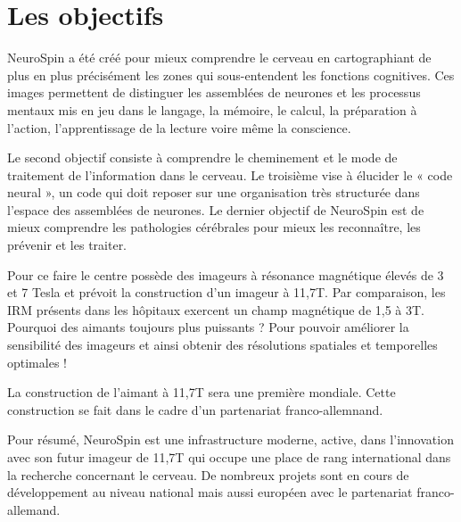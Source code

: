 \section{Les objectifs}

NeuroSpin a été créé pour mieux comprendre le cerveau en cartographiant de plus en plus précisément les zones qui sous-entendent les fonctions cognitives.
Ces images permettent de distinguer les assemblées de neurones et les processus mentaux mis en jeu dans le langage, la mémoire, le calcul, la préparation à l’action, l’apprentissage de la lecture voire même la conscience. 

Le second objectif consiste à comprendre le cheminement et le mode de traitement de l’information dans le cerveau.
Le troisième vise à élucider le « code neural », un code qui doit reposer sur une organisation très structurée dans l’espace des assemblées de neurones.
Le dernier objectif de NeuroSpin est de mieux comprendre les pathologies cérébrales pour mieux les reconnaître, les prévenir et les traiter.

Pour ce faire le centre possède des imageurs à résonance magnétique élevés de 3 et 7 Tesla et prévoit la construction d’un imageur à 11,7T. Par comparaison, les IRM présents dans les hôpitaux exercent un champ magnétique de 1,5 à 3T. Pourquoi des aimants toujours plus puissants ? Pour pouvoir améliorer la sensibilité des imageurs et ainsi obtenir des résolutions spatiales et temporelles optimales !

La construction de l’aimant à 11,7T sera une première mondiale. Cette construction se fait dans le cadre d’un partenariat franco-allemnand.

Pour résumé, NeuroSpin est une infrastructure moderne, active, dans l’innovation avec son futur imageur de 11,7T qui occupe une place de rang international dans la recherche concernant le cerveau. De nombreux projets sont en cours de développement au niveau national mais aussi européen avec le partenariat franco-allemand.
